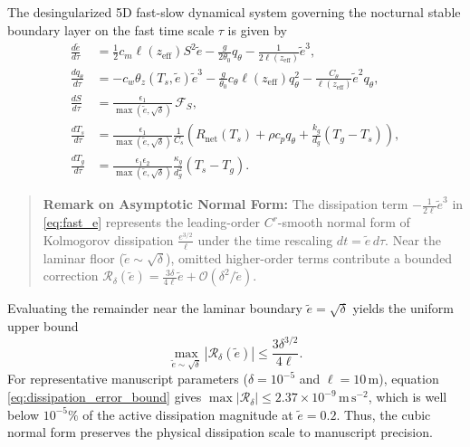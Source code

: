 \documentclass[11pt]{article}
\begin{document}
The desingularized 5D fast-slow dynamical system governing the nocturnal stable boundary layer on the fast time scale $\tau$ is given by
\begin{align}
\frac{d\tilde{e}}{d\tau} &= \frac{1}{2} c_m \ell(z_{\text{eff}}) S^2 \tilde{e} - \frac{g}{2\theta_0} q_\theta - \frac{1}{2\ell(z_{\text{eff}})} \tilde{e}^3, \label{eq:fast_e}\\
\frac{dq_\theta}{d\tau} &= -c_w \theta_z(T_s,\tilde{e})\tilde{e}^3 - \frac{g}{\theta_0}c_\theta \ell(z_{\text{eff}}) q_\theta^2 - \frac{C_\theta}{\ell(z_{\text{eff}})}\tilde{e}^2 q_\theta, \label{eq:fast_q}\\
\frac{dS}{d\tau} &= \frac{\epsilon_1}{\max\left(\tilde{e},\sqrt{\delta}\right)}\,\mathcal{F}_S, \label{eq:slow_S}\\
\frac{dT_s}{d\tau} &= \frac{\epsilon_1}{\max\left(\tilde{e},\sqrt{\delta}\right)}\frac{1}{C_s}\left(R_{\text{net}}(T_s) + \rho c_p q_\theta + \frac{k_g}{d_g}(T_g-T_s)\right), \label{eq:slow_Ts}\\
\frac{dT_g}{d\tau} &= \frac{\epsilon_1\epsilon_2}{\max\left(\tilde{e},\sqrt{\delta}\right)}\frac{\kappa_g}{d_g^2}(T_s-T_g). \label{eq:superslow_Tg}
\end{align}

\begin{quote}
\small
\textbf{Remark on Asymptotic Normal Form:} The dissipation term $-\frac{1}{2\ell}\tilde{e}^3$ in \eqref{eq:fast_e} represents the leading-order $C^r$-smooth normal form of Kolmogorov dissipation $\frac{e^{3/2}}{\ell}$ under the time rescaling $dt = \tilde{e}\,d\tau$. Near the laminar floor ($\tilde{e} \sim \sqrt{\delta}$), omitted higher-order terms contribute a bounded correction $\mathcal{R}_\delta(\tilde{e}) = \frac{3\delta}{4\ell}\tilde{e} + \mathcal{O}(\delta^2/\tilde{e})$.
\end{quote}

Evaluating the remainder near the laminar boundary $\tilde{e} = \sqrt{\delta}$ yields the uniform upper bound
\begin{equation}
\max_{\tilde{e} \sim \sqrt{\delta}} \left\lvert \mathcal{R}_\delta(\tilde{e}) \right\rvert \le \frac{3\delta^{3/2}}{4\ell}.
\label{eq:dissipation_error_bound}
\end{equation}
For representative manuscript parameters ($\delta = 10^{-5}$ and $\ell = 10\,\mathrm{m}$), equation \eqref{eq:dissipation_error_bound} gives $\max \lvert \mathcal{R}_\delta \rvert \le 2.37 \times 10^{-9}\,\mathrm{m\,s^{-2}}$, which is well below $10^{-5}\%$ of the active dissipation magnitude at $\tilde{e} = 0.2$. Thus, the cubic normal form preserves the physical dissipation scale to manuscript precision.
\end{document}
